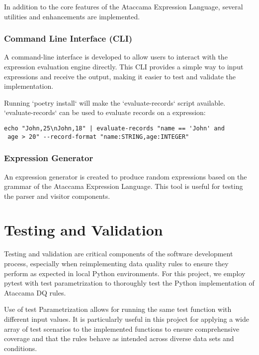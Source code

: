 In addition to the core features of the Ataccama Expression Language, several utilities and enhancements are implemented.

\subsubsection{Command Line Interface (CLI)}

A command-line interface is developed to allow users to interact with the expression evaluation engine directly. This CLI provides a simple way to input expressions and receive the output, making it easier to test and validate the implementation.

Running `poetry install` will make the `evaluate-records` script available.
`evaluate-records` can be used to evaluate records on a expression:

\begin{verbatim}
echo "John,25\nJohn,18" | evaluate-records "name == 'John' and
 age > 20" --record-format "name:STRING,age:INTEGER"
\end{verbatim}

\subsubsection{Expression Generator}

An expression generator is created to produce random expressions based on the grammar of the Ataccama Expression Language. This tool is useful for testing the parser and visitor components.

\section{Testing and Validation}

Testing and validation are critical components of the software development process, especially when reimplementing data quality rules to ensure they perform as expected in local Python environments. For this project, we employ pytest with test parametrization to thoroughly test the Python implementation of Ataccama DQ rules.


Use of test Parametrization allows for running the same test function with different input values. It is particularly useful in this project for applying a wide array of test scenarios to the implemented functions to ensure comprehensive coverage and that the rules behave as intended across diverse data sets and conditions.

